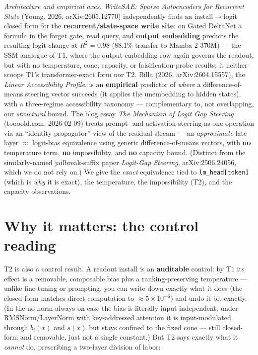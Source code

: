 \documentclass[11pt]{article}
\theoremstyle{plain}
\theoremstyle{definition}
\begin{document}
\emph{Architecture and empirical axes.} \emph{WriteSAE: Sparse Autoencoders for Recurrent State} (Young, 2026, arXiv:2605.12770) independently finds an install$\to$logit closed form for the \textbf{recurrent/state-space write site}: on Gated DeltaNet a formula in the forget gate, read query, and \textbf{output embedding} predicts the resulting logit change at $R^2=0.98$ (88.1\% transfer to Mamba-2-370M) --- the SSM analogue of T1, where the output-embedding row again governs the readout, but with no temperature, cone, capacity, or falsification-probe results; it neither scoops T1's transformer-exact form nor T2. Billa (2026, arXiv:2604.15557), the \emph{Linear Accessibility Profile}, is an \textbf{empirical} predictor of \emph{where} a difference-of-means steering vector succeeds (it applies the unembedding to hidden states), with a three-regime accessibility taxonomy --- complementary to, not overlapping, our \emph{structural} bound. The blog essay \emph{The Mechanism of Logit Gap Steering} (toooold.com, 2026-02-09) treats prompt- and activation-steering as one operation via an ``identity-propagator'' view of the residual stream --- an \emph{approximate} late-layer $\approx$ logit-bias equivalence using generic difference-of-means vectors, with \textbf{no} temperature term, \textbf{no} impossibility, and \textbf{no} capacity bound. (Distinct from the similarly-named jailbreak-suffix paper \emph{Logit-Gap Steering}, arXiv:2506.24056, which we do not rely on.) We give the \emph{exact} equivalence tied to \texttt{lm\_head[token]} (which is \emph{why} it is exact), the temperature, the impossibility (T2), and the capacity observations.

\section{Why it matters: the control reading}

T2 is also a control result. A readout install is an \textbf{auditable} control: by T1 its effect is a removable, composable bias plus a ranking-preserving temperature --- unlike fine-tuning or prompting, you can write down exactly what it does (the closed form matches direct computation to $\approx 5\times10^{-6}$) and undo it bit-exactly. (In the no-norm always-on case the bias is literally input-independent; under RMSNorm/LayerNorm with key-addressed attention it is input-modulated through $b_i(x)$ and $s(x)$ but stays confined to the fixed cone --- still closed-form and removable, just not a single constant.) But T2 says exactly what it \emph{cannot} do, prescribing a two-layer division of labor:
\end{document}
